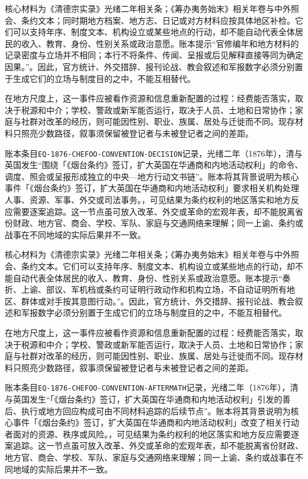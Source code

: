核心材料为《清德宗实录》光绪二年相关条；《筹办夷务始末》相关年卷与中外照会、条约文本；同时期地方档案、地方志、日记或对方材料应按具体地区补检。它们可以支持年序、制度文本、机构设立或某些地点的行动，却不能自动代表全体居民的收入、教育、身份、性别关系或政治意愿。账本提示“官修编年和地方材料的记录密度与立场并不相同；本行不将条件、传闻、呈报或后见解释直接等同为确定因果。”。因此，官方统计、外交措辞、报刊论战、教会叙述和军报数字必须分别置于生成它们的立场与制度目的之中，不能互相替代。

在地方尺度上，这一事件应被看作资源和信息重新配置的过程：经费能否落实，取决于税源和中介；学校、警政或新军能否运行，取决于人员、土地和日常协作；家庭与社群对改革的经历，则可能因性别、职业、族属、居处与迁徙而不同。现存材料只照亮少数路径，叙事须保留被登记者与未被登记者之间的差距。

账本条目\texttt{EQ-1876-CHEFOO-CONVENTION-DECISION}记录，光绪二年（1876年），清与英国发生“围绕「《烟台条约》签订，扩大英国在华通商和内地活动权利」的命令、调度、照会或呈报形成独立的中央—地方行动文书链”。账本将其背景说明为核心事件「《烟台条约》签订，扩大英国在华通商和内地活动权利」要求相关机构处理人事、资源、军事、外交或司法事务。，可见结果为条约权利的地区落实和地方反应需要逐案追踪。这一节点虽可放入改革、外交或革命的宏观年表，却不能脱离省份财政、地方官、商会、学校、军队、家庭与交通网络来理解；同一上谕、条约或战事在不同地域的实际后果并不一致。

核心材料为《清德宗实录》光绪二年相关条；《筹办夷务始末》相关年卷与中外照会、条约文本。它们可以支持年序、制度文本、机构设立或某些地点的行动，却不能自动代表全体居民的收入、教育、身份、性别关系或政治意愿。账本提示“奏折、上谕、部议、军机档或条约可证明行政动作和机构立场，不自动证明所有地区、群体或对手按其意图行动。”。因此，官方统计、外交措辞、报刊论战、教会叙述和军报数字必须分别置于生成它们的立场与制度目的之中，不能互相替代。

在地方尺度上，这一事件应被看作资源和信息重新配置的过程：经费能否落实，取决于税源和中介；学校、警政或新军能否运行，取决于人员、土地和日常协作；家庭与社群对改革的经历，则可能因性别、职业、族属、居处与迁徙而不同。现存材料只照亮少数路径，叙事须保留被登记者与未被登记者之间的差距。

账本条目\texttt{EQ-1876-CHEFOO-CONVENTION-AFTERMATH}记录，光绪二年（1876年），清与英国发生“「《烟台条约》签订，扩大英国在华通商和内地活动权利」引发的善后、执行或地方回应构成可由不同材料追踪的后续节点”。账本将其背景说明为核心事件「《烟台条约》签订，扩大英国在华通商和内地活动权利」改变了相关行动者面对的资源、秩序或风险。，可见结果为条约权利的地区落实和地方反应需要逐案追踪。这一节点虽可放入改革、外交或革命的宏观年表，却不能脱离省份财政、地方官、商会、学校、军队、家庭与交通网络来理解；同一上谕、条约或战事在不同地域的实际后果并不一致。

